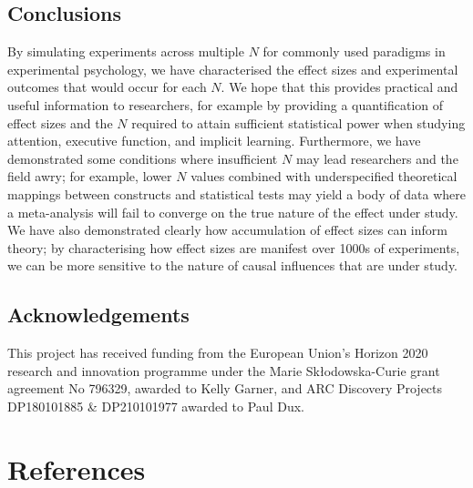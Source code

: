 \documentclass{article}
\begin{document}
\hypertarget{conclusions}{%
\subsection{Conclusions}\label{conclusions}}

By simulating experiments across multiple \(N\) for commonly used paradigms in experimental psychology, we have characterised the effect sizes and experimental outcomes that would occur for each \(N\). We hope that this provides practical and useful information to researchers, for example by providing a quantification of effect sizes and the \(N\) required to attain sufficient statistical power when studying attention, executive function, and implicit learning. Furthermore, we have demonstrated some conditions where insufficient \(N\) may lead researchers and the field awry; for example, lower \(N\) values combined with underspecified theoretical mappings between constructs and statistical tests may yield a body of data where a meta-analysis will fail to converge on the true nature of the effect under study. We have also demonstrated clearly how accumulation of effect sizes can inform theory; by characterising how effect sizes are manifest over 1000s of experiments, we can be more sensitive to the nature of causal influences that are under study.

\hypertarget{acknowledgements}{%
\subsection{Acknowledgements}\label{acknowledgements}}

This project has received funding from the European Union's Horizon 2020 research and innovation programme under the Marie Skłodowska-Curie grant agreement No 796329, awarded to Kelly Garner, and ARC Discovery Projects DP180101885 \& DP210101977 awarded to Paul Dux.

\clearpage

\hypertarget{references}{%
\section{References}\label{references}}

\label{sec:Refref}
\end{document}
